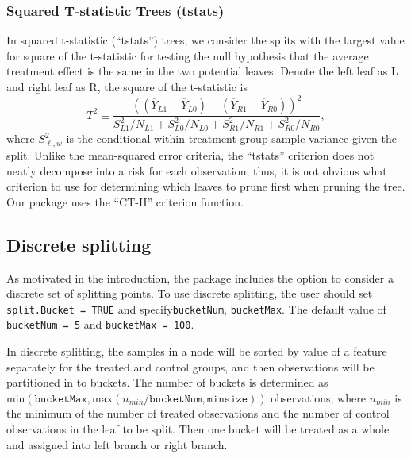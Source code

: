 \documentclass[11pt]{article}
\newcommand{\oy}{\overline{Y}}
\begin{document}
\subsubsection{Squared T-statistic Trees (\textbf{tstats})}
In squared t-statistic (``tstats'') trees, we consider the splits with the largest value for square of the t-statistic for testing the null hypothesis that the average treatment effect is the same in the two potential leaves. Denote the left leaf as L and right leaf as R, the square of the t-statistic is 
\[ T^2 \equiv \frac{((\oy_{L1}-\oy_{L0})-
(\oy_{R1}-\oy_{R0})
)^2}{S_{L1}^2/N_{L1}+ S_{L0}^2/N_{L0}+S_{R1}^2/N_{R1}+S_{R0}^2/N_{R0}},\]
where $S_{\ell,w}^2$ is the conditional within treatment group sample variance given the split.  Unlike the mean-squared error criteria, the ``tstats'' criterion does not neatly 
decompose into a risk for each observation; thus, it is not obvious what criterion to use for determining which leaves to prune first when pruning the tree.  Our package uses
the ``CT-H'' criterion function. 
\subsection{Discrete splitting}
As motivated in the introduction, the package includes the option to consider a discrete set of splitting points. To use discrete splitting, the user should set \texttt{split.Bucket = TRUE} and specify\texttt{bucketNum}, \texttt{bucketMax}. The default value of \texttt{bucketNum = 5} and \texttt{bucketMax = 100}.\par
In discrete splitting, the samples in a node will be sorted by value of a feature separately for the treated and control groups, and then observations will be partitioned in to buckets. The number of buckets is determined as $\text{min}(\texttt{bucketMax},\text{max}(n_{min}/\texttt{bucketNum},\texttt{minsize}))$ observations, where $n_{min}$ is the minimum of the 
number of treated observations and the number of control observations in the leaf to be split. Then one bucket will be treated as a whole and assigned into left branch or right branch. 
\end{document}
